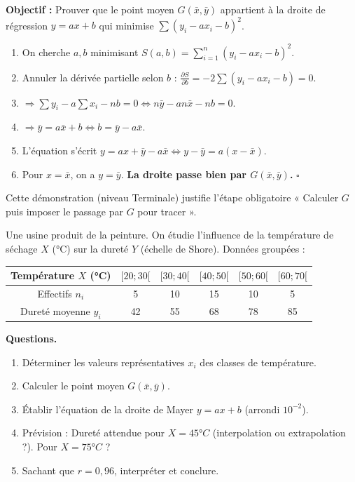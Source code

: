 \documentclass[11pt]{article}
\begin{document}
\begin{experience}
\textbf{Objectif :} Prouver que le point moyen $G(\bar{x}, \bar{y})$ appartient à la droite de régression $y = ax + b$ qui minimise $\sum (y_i - ax_i - b)^2$.

\begin{enumerate}
    \item On cherche $a, b$ minimisant $S(a,b) = \sum_{i=1}^n (y_i - ax_i - b)^2$.
    \item Annuler la dérivée partielle selon $b$ : $\frac{\partial S}{\partial b} = -2 \sum (y_i - ax_i - b) = 0$.
    \item $\Rightarrow \sum y_i - a\sum x_i - nb = 0 \iff n\bar{y} - a n\bar{x} - nb = 0$.
    \item $\Rightarrow \bar{y} = a\bar{x} + b \iff b = \bar{y} - a\bar{x}$.
    \item L'équation s'écrit $y = ax + \bar{y} - a\bar{x} \iff y - \bar{y} = a(x - \bar{x})$.
    \item Pour $x = \bar{x}$, on a $y = \bar{y}$. \textbf{La droite passe bien par $G(\bar{x}, \bar{y})$.} \hfill$\square$
\end{enumerate}
Cette démonstration (niveau Terminale) justifie l'étape obligatoire « Calculer $G$ puis imposer le passage par $G$ pour tracer ».
\end{experience}

\begin{exercice}
Une usine produit de la peinture. On étudie l'influence de la température de séchage $X$ (°C) sur la dureté $Y$ (échelle de Shore). Données groupées :

\begin{center}
\begin{tabular}{|c|c|c|c|c|c|}\hline
Température $X$ (°C) & $[20;30[$ & $[30;40[$ & $[40;50[$ & $[50;60[$ & $[60;70[$ \\ \hline
Effectifs $n_i$ & 5 & 10 & 15 & 10 & 5 \\ \hline
Dureté moyenne $y_i$ & 42 & 55 & 68 & 78 & 85 \\ \hline
\end{tabular}
\end{center}

\textbf{Questions.}
\begin{enumerate}
    \item Déterminer les valeurs représentatives $x_i$ des classes de température.
    \item Calculer le point moyen $G(\bar{x}, \bar{y})$.
    \item Établir l'équation de la droite de Mayer $y = ax + b$ (arrondi $10^{-2}$).
    \item Prévision : Dureté attendue pour $X = 45°C$ (interpolation ou extrapolation ?). Pour $X = 75°C$ ?
    \item Sachant que $r = 0,96$, interpréter et conclure.
\end{enumerate}
\end{exercice}
\end{document}
